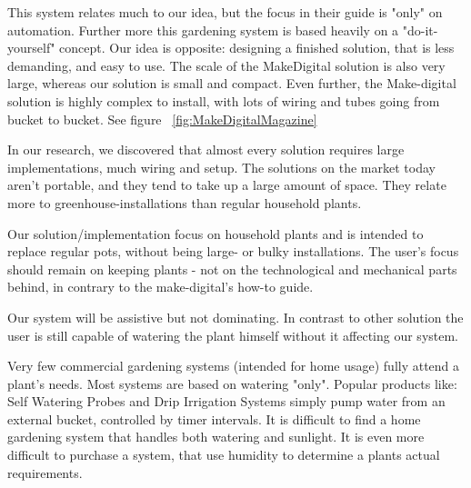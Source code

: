\documentclass{ubicomp2012}
\begin{document}
This system relates much to our idea, but the focus in their guide is "only" on automation. Further more this gardening system is based heavily on a "do-it-yourself" concept. Our idea is opposite: designing a finished solution, that is less demanding, and easy to use.
The scale of the MakeDigital solution is also very large, whereas our solution is small and compact. Even further, the Make-digital solution is highly complex to install, with lots of wiring and tubes going from bucket to bucket. See figure ~\ref{fig:MakeDigitalMagazine}

In our research, we discovered that almost every solution requires large implementations, much wiring and setup. The solutions on the market today aren't portable, and they tend to take up a large amount of space. They relate more to greenhouse-installations than regular household plants.

Our solution/implementation focus on household plants and is intended to replace regular pots, without being large- or bulky installations. The user's focus should remain on keeping plants - not on the technological and mechanical parts behind, in contrary to the make-digital's how-to guide.

Our system will be assistive but not dominating. In contrast to other solution the user is still capable of watering the plant himself without it affecting our system.

Very few commercial gardening systems (intended for home usage) fully attend a plant’s needs. Most systems are based on watering "only". Popular products like: Self Watering Probes \cite{self-watering-probes} and Drip Irrigation Systems \cite{moreland} simply pump water from an external bucket, controlled by timer intervals.
It is difficult to find a home gardening system that handles both watering and sunlight. It is even more difficult to purchase a system, that use humidity to determine a plants actual requirements.
\end{document}
